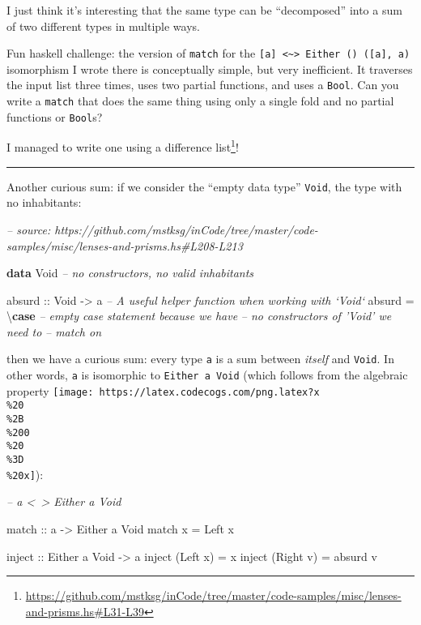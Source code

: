 \documentclass[]{article}
\newenvironment{Shaded}{}{}
\newcommand{\CommentTok}[1]{\textcolor[rgb]{0.38,0.63,0.69}{\textit{#1}}}
\newcommand{\DataTypeTok}[1]{\textcolor[rgb]{0.56,0.13,0.00}{#1}}
\newcommand{\FunctionTok}[1]{\textcolor[rgb]{0.02,0.16,0.49}{#1}}
\newcommand{\KeywordTok}[1]{\textcolor[rgb]{0.00,0.44,0.13}{\textbf{#1}}}
\newcommand{\NormalTok}[1]{#1}
\newcommand{\OtherTok}[1]{\textcolor[rgb]{0.00,0.44,0.13}{#1}}
\renewcommand{\href}[2]{#2\footnote{\url{#1}}}
\begin{document}
I just think it's interesting that the same type can be ``decomposed'' into a
sum of two different types in multiple ways.

Fun haskell challenge: the version of \texttt{match} for the
\texttt{{[}a{]}\ \textless{}\textasciitilde{}\textgreater{}\ Either\ ()\ ({[}a{]},\ a)}
isomorphism I wrote there is conceptually simple, but very inefficient. It
traverses the input list three times, uses two partial functions, and uses a
\texttt{Bool}. Can you write a \texttt{match} that does the same thing using
only a single fold and no partial functions or \texttt{Bool}s?

I managed to write one
\href{https://github.com/mstksg/inCode/tree/master/code-samples/misc/lenses-and-prisms.hs\#L31-L39}{using
a difference list}!

\begin{center}\rule{0.5\linewidth}{\linethickness}\end{center}

Another curious sum: if we consider the ``empty data type'' \texttt{Void}, the
type with no inhabitants:

\begin{Shaded}
\begin{Highlighting}[]
\CommentTok{-- source: https://github.com/mstksg/inCode/tree/master/code-samples/misc/lenses-and-prisms.hs#L208-L213}

\KeywordTok{data} \DataTypeTok{Void}           \CommentTok{-- no constructors, no valid inhabitants}

\OtherTok{absurd ::} \DataTypeTok{Void} \OtherTok{->}\NormalTok{ a     }\CommentTok{-- A useful helper function when working with `Void`}
\NormalTok{absurd }\FunctionTok{=}\NormalTok{ \textbackslash{}}\KeywordTok{case} \CommentTok{-- empty case statement because we have}
               \CommentTok{-- no constructors of 'Void' we need to}
               \CommentTok{-- match on}
\end{Highlighting}
\end{Shaded}

then we have a curious sum: every type \texttt{a} is a sum between \emph{itself}
and \texttt{Void}. In other words, \texttt{a} is isomorphic to
\texttt{Either\ a\ Void} (which follows from the algebraic property
\texttt{[image: https://latex.codecogs.com/png.latex?x\\\%20\\\%2B\\\%200\\\%20\\\%3D\\\%20x]}):

\begin{Shaded}
\begin{Highlighting}[]
\CommentTok{-- a <~> Either a Void}

\OtherTok{match ::}\NormalTok{ a }\OtherTok{->} \DataTypeTok{Either}\NormalTok{ a }\DataTypeTok{Void}
\NormalTok{match x }\FunctionTok{=} \DataTypeTok{Left}\NormalTok{ x}

\OtherTok{inject ::} \DataTypeTok{Either}\NormalTok{ a }\DataTypeTok{Void} \OtherTok{->}\NormalTok{ a}
\NormalTok{inject (}\DataTypeTok{Left}\NormalTok{  x) }\FunctionTok{=}\NormalTok{ x}
\NormalTok{inject (}\DataTypeTok{Right}\NormalTok{ v) }\FunctionTok{=}\NormalTok{ absurd v}
\end{Highlighting}
\end{Shaded}
\end{document}
